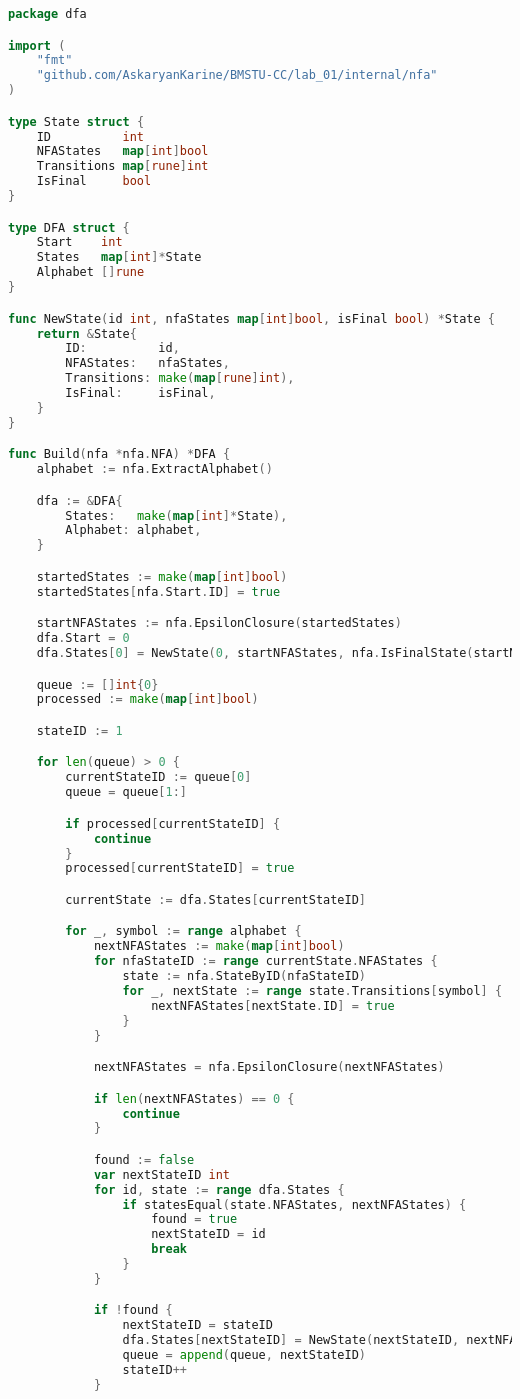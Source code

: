 \begin{lstlisting}[language=Go, caption={Код модуля \textit{dfa}}]
package dfa

import (
	"fmt"
	"github.com/AskaryanKarine/BMSTU-CC/lab_01/internal/nfa"
)

type State struct {
	ID          int
	NFAStates   map[int]bool
	Transitions map[rune]int
	IsFinal     bool
}

type DFA struct {
	Start    int
	States   map[int]*State
	Alphabet []rune
}

func NewState(id int, nfaStates map[int]bool, isFinal bool) *State {
	return &State{
		ID:          id,
		NFAStates:   nfaStates,
		Transitions: make(map[rune]int),
		IsFinal:     isFinal,
	}
}

func Build(nfa *nfa.NFA) *DFA {
	alphabet := nfa.ExtractAlphabet()

	dfa := &DFA{
		States:   make(map[int]*State),
		Alphabet: alphabet,
	}

	startedStates := make(map[int]bool)
	startedStates[nfa.Start.ID] = true

	startNFAStates := nfa.EpsilonClosure(startedStates)
	dfa.Start = 0
	dfa.States[0] = NewState(0, startNFAStates, nfa.IsFinalState(startNFAStates))

	queue := []int{0}
	processed := make(map[int]bool)

	stateID := 1

	for len(queue) > 0 {
		currentStateID := queue[0]
		queue = queue[1:]

		if processed[currentStateID] {
			continue
		}
		processed[currentStateID] = true

		currentState := dfa.States[currentStateID]

		for _, symbol := range alphabet {
			nextNFAStates := make(map[int]bool)
			for nfaStateID := range currentState.NFAStates {
				state := nfa.StateByID(nfaStateID)
				for _, nextState := range state.Transitions[symbol] {
					nextNFAStates[nextState.ID] = true
				}
			}

			nextNFAStates = nfa.EpsilonClosure(nextNFAStates)

			if len(nextNFAStates) == 0 {
				continue
			}

			found := false
			var nextStateID int
			for id, state := range dfa.States {
				if statesEqual(state.NFAStates, nextNFAStates) {
					found = true
					nextStateID = id
					break
				}
			}

			if !found {
				nextStateID = stateID
				dfa.States[nextStateID] = NewState(nextStateID, nextNFAStates, nfa.IsFinalState(nextNFAStates))
				queue = append(queue, nextStateID)
				stateID++
			}


\end{lstlisting}
